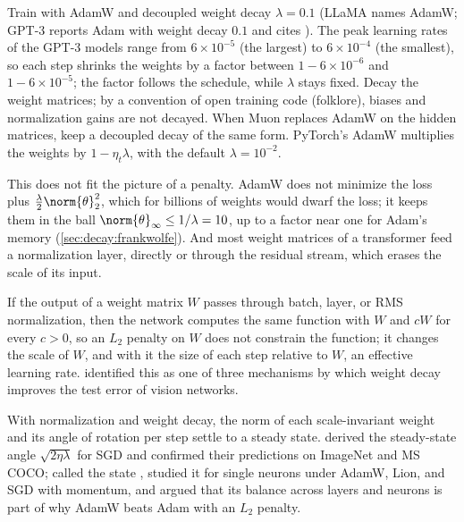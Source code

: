 \begin{refsection}
\begin{practice}
Train with AdamW and decoupled weight decay $\lambda=0.1$ (LLaMA names AdamW; GPT-3 reports Adam with weight decay $0.1$ and cites \textcite{LoshchilovHutter2019}). The peak learning rates of the GPT-3 models range from $6\times10^{-5}$ (the largest) to $6\times10^{-4}$ (the smallest), so each step shrinks the weights by a factor between $1-6\times10^{-6}$ and $1-6\times10^{-5}$; the factor follows the schedule, while $\lambda$ stays fixed. Decay the weight matrices; by a convention of open training code (folklore), biases and normalization gains are not decayed. When Muon replaces AdamW on the hidden matrices, keep a decoupled decay of the same form. PyTorch's AdamW multiplies the weights by $1-\eta_t\lambda$, with the default $\lambda=10^{-2}$.
\end{practice}

This does not fit the picture of a penalty. AdamW does not minimize the loss plus $\frac\lambda2\norm{\theta}_2^2$, which for billions of weights would dwarf the loss; it keeps them in the ball $\norm{\theta}_\infty\le1/\lambda=10$, up to a factor near one for Adam's memory (\cref{sec:decay:frankwolfe}). And most weight matrices of a transformer feed a normalization layer, directly or through the residual stream, which erases the scale of its input.

\begin{observation}\label{obs:decay:elr}
If the output of a weight matrix $W$ passes through batch, layer, or RMS normalization, then the network computes the same function with $W$ and $cW$ for every $c>0$, so an $L_2$ penalty on $W$ does not constrain the function; it changes the scale of $W$, and with it the size of each step relative to $W$, an effective learning rate. \Textcite{ZhangEtAl2019} identified this as one of three mechanisms by which weight decay improves the test error of vision networks.
\end{observation}

\begin{observation}\label{obs:decay:rotation}
With normalization and weight decay, the norm of each scale-invariant weight and its angle of rotation per step settle to a steady state. \Textcite{WanEtAl2021} derived the steady-state angle $\sqrt{2\eta\lambda}$ for SGD and confirmed their predictions on ImageNet and MS COCO; \textcite{KossonMessmerJaggi2024} called the state , studied it for single neurons under AdamW, Lion, and SGD with momentum, and argued that its balance across layers and neurons is part of why AdamW beats Adam with an $L_2$ penalty.
\end{observation}


\end{refsection}
